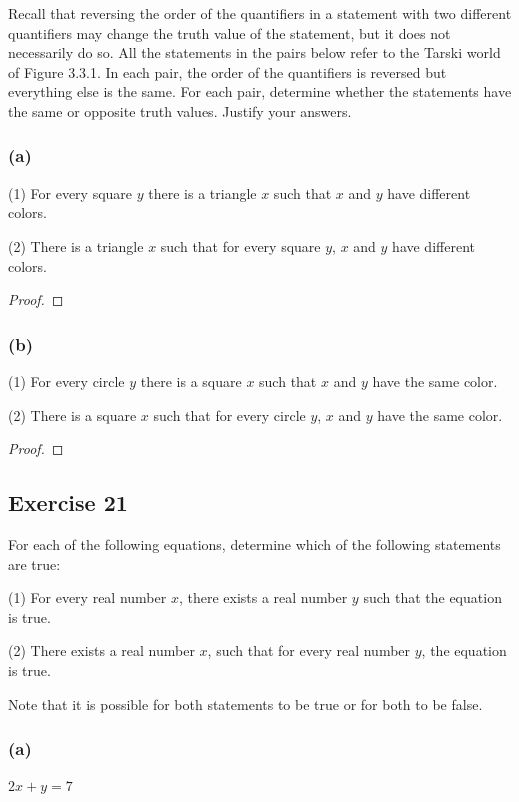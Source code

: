 \documentclass[14pt]{extarticle}
\begin{document}
Recall that reversing the order of the quantifiers in a statement with two different quantifiers may change the truth value of the statement, but it does not necessarily do so. All the statements in the pairs below refer to the Tarski world of Figure 3.3.1. In each pair, the order of the quantifiers is reversed but everything else is the same. For each pair, determine whether the statements have the same or opposite truth values. Justify your answers.

\subsubsection{(a)}
(1) For every square $y$ there is a triangle $x$ such that $x$ and $y$ have different colors.

(2) There is a triangle $x$ such that for every square $y$, $x$ and $y$ have different colors.

\begin{proof}

\end{proof}

\subsubsection{(b)}
(1) For every circle $y$ there is a square $x$ such that $x$ and $y$ have the same color.

(2) There is a square $x$ such that for every circle $y$, $x$ and $y$ have the same color.

\begin{proof}

\end{proof}

\subsection{Exercise 21}
For each of the following equations, determine which of the following statements are true:

(1) For every real number $x$, there exists a real number $y$ such that the equation is true.

(2) There exists a real number $x$, such that for every real number $y$, the equation is true.

Note that it is possible for both statements to be true or for both to be false.

\subsubsection{(a)}
$2x + y = 7$
\end{document}
